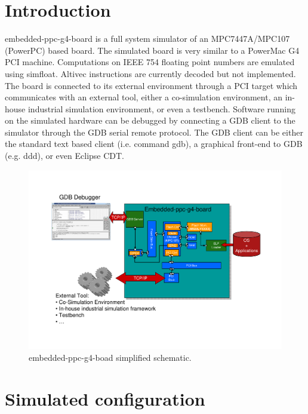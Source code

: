 \section{Introduction}

embedded-ppc-g4-board is a full system simulator of an MPC7447A/MPC107 (PowerPC) based board. The simulated board is very similar to a PowerMac G4 PCI machine. Computations on IEEE 754 floating point numbers are emulated using simfloat. Altivec instructions are currently decoded but not implemented. The board is connected to its external environment through a PCI target which communicates with an external tool, either a co-simulation environment, an in-house industrial simulation environment, or even a testbench. Software running on the simulated hardware can be debugged by connecting a GDB client to the simulator through the GDB serial remote protocol. The GDB client can be either the standard text based client (i.e. command gdb), a graphical front-end to GDB (e.g. ddd), or even Eclipse CDT.

\begin{figure}[!h]
	\begin{center}
		\includegraphics[width=\textwidth]{embedded_ppc_g4_board/fig_embedded_ppc_g4_board.pdf}
	\end{center}
	\caption{embedded-ppc-g4-boad simplified schematic.}
	\label{fig:ppcemu_system}
\end{figure}

\section{Simulated configuration}

